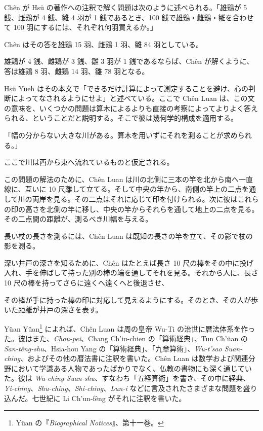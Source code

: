\documentclass[11pt]{article}
\newcommand{\scanpage}[2]{\clearpage\setcounter{footnote}{0}\noindent{\footnotesize\color{gray}PDF #1 頁 · #2}\par\medskip}
\newcommand{\scanfooter}{}
\begin{document}
Chên が Hsü の著作への注釈で解く問題は次のように述べられる。「雄鶏が 5 銭、雌鶏が 4 銭、雛 4 羽が 1 銭であるとき、100 銭で雄鶏・雌鶏・雛を合わせて 100 羽にするには、それぞれ何羽買えるか。」

Chên はその答を雄鶏 15 羽、雌鶏 1 羽、雛 84 羽としている。

雄鶏が 4 銭、雌鶏が 3 銭、雛 3 羽が 1 銭であるならば、Chên が解くように、答は雄鶏 8 羽、雌鶏 14 羽、雛 78 羽となる。

Hsü Yüeh はその本文で「できるだけ計算によって測定することを避け、心の判断によってなされるようにせよ」と述べている。ここで Chên Luan は、この文の意味を、いくつかの問題は算木によるよりも直接の考察によってよりよく答えられる、ということだと説明する。そこで彼は幾何学的構成を適用する。

「幅の分からない大きな川がある。算木を用いずにそれを測ることが求められる。」

ここで川は西から東へ流れているものと仮定される。

この問題の解法のために、Chên Luan は川の北側に三本の竿を北から南へ一直線に、互いに 10 尺離して立てる。そして中央の竿から、南側の竿上の二点を通して川の両岸を見る。その二点はそれに応じて印を付けられる。次に彼はこれらの印の高さを北側の竿に移し、中央の竿からそれらを通して地上の二点を見る。その二点間の距離が、測るべき川幅を与える。

長い杖の長さを測るには、Chên Luan は既知の長さの竿を立て、その影で杖の影を測る。

深い井戸の深さを知るために、Chên はたとえば長さ 10 尺の棒をその中に投げ入れ、手を伸ばして持った別の棒の端を通してそれを見る。それから人に、長さ 10 尺の棒を持ってさらに遠くへ遠くへと後退させ、
\scanfooter

\scanpage{0059}{第六章、印刷頁45；章終わり}

その棒が手に持った棒の印に対応して見えるようにする。そのとき、その人が歩いた距離が井戸の深さを表す。

Yüan Yüan\footnote{Yüan の『\emph{Biographical Notices}』、第十一巻。} によれば、Chên Luan は周の皇帝 Wu-Ti の治世に暦法体系を作った。彼はまた、\emph{Chou-pei}、Chang Ch'iu-chien の「算術経典」、Tun Ch'üan の \emph{San-têng-shu}、Hsia-hou Yang の「算術経典」、「九章算術」、\emph{Wu-t'sao Suan-ching}、およびその他の暦法書に注釈を書いた。Chên Luan は数学および関連分野において学識ある人物であったばかりでなく、仏教の書物にも深く通じていた。彼は \emph{Wu-ching Suan-shu}、すなわち「五経算術」を書き、その中に経典、\emph{Yi-ching}、\emph{Shu-ching}、\emph{Shi-ching}、\emph{Lun-i} などに言及されたさまざまな問題を盛り込んだ。七世紀に Li Ch'un-fêng がそれに注釈を書いた。
\end{document}
